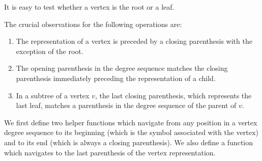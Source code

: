 It is easy to test whether a vertex is the root or a leaf.

\begin{algorithm}
\begin{algorithmic}
	\State {} 
\EndFunction
\end{algorithmic}
\end{algorithm}

\begin{algorithm}
\begin{algorithmic}
	\State {} 
\EndFunction
\end{algorithmic}
\end{algorithm}

The crucial observations for the following operations are:
\begin{enumerate}
	\item The representation of a vertex is preceded by a closing parenthesis with the exception of the root.
	\item The opening parenthesis in the degree sequence matches the closing parenthesis immediately preceding the representation of a child.
	\item In a subtree of a vertex $v$, the last closing parenthesis, which represents the last leaf, matches a parenthesis in the degree sequence of the parent of $v$.
\end{enumerate}

We first define two helper functions which navigate from any position in a vertex degree sequence to its beginning (which is the symbol associated with the vertex) and to its end (which is always a closing parenthesis).
We also define a function which navigates to the last parenthesis of the vertex representation.

\begin{algorithm}
\begin{algorithmic}
		\State {} 
		\State {} 
	\Else
		\State {}
	\EndIf
\EndFunction
\end{algorithmic}
\end{algorithm}

\begin{algorithm}
\begin{algorithmic}
		\State {}
	\Else
		\State {}
	\EndIf
\EndFunction
\end{algorithmic}
\end{algorithm}

